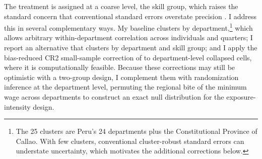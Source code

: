 The treatment is assigned at a coarse level, the skill group, which raises the standard concern
that conventional standard errors overstate precision \citep{bertrand_2004}. I address this in
several complementary ways. My baseline clusters by department,\footnote{The 25 clusters are
Peru's 24 departments plus the Constitutional Province of Callao. With few clusters,
conventional cluster-robust standard errors can understate uncertainty, which motivates the
additional corrections below.} which allows arbitrary
within-department correlation across individuals and quarters; I report an alternative that
clusters by department and skill group; and I apply the bias-reduced CR2 small-sample correction
of \citet{pustejovsky_tipton_2018} to department-level collapsed cells, where it is
computationally feasible. Because these corrections may still be optimistic with a two-group
design, I complement them with randomization inference at the department level, permuting the
regional bite of the minimum wage across departments to construct an exact null distribution for
the exposure-intensity design.
